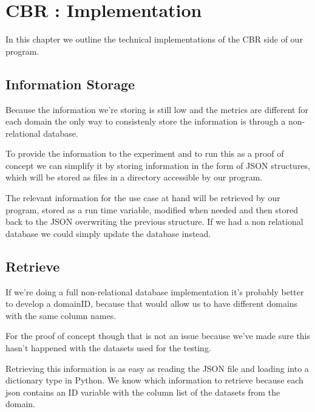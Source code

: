 %
%

\chapter{CBR : Implementation}
\linespread{1.6}
\begin{resumen}
In this chapter we outline the technical implementations of the CBR side of our program.
\end{resumen}

\section{Information Storage}
\label{cap1:sec:informationstorage}

Because the information we're storing is still low and the metrics are different for each domain the only way to consistenly store the information is through a non-relational database.

To provide the information to the experiment and to run this as a proof of concept we can simplify it by storing information in the form of JSON structures, which will be stored as files in a directory accessible by our program.

The relevant information for the use case at hand will be retrieved by our program, stored as a run time variable, modified when needed and then stored back to the JSON overwriting the previous structure.
If we had a non relational database we could simply update the database instead.

\section{Retrieve}
\label{cap1:sec:retrieve}
If we're doing a full non-relational database implementation it's probably better to develop a domainID, because that would allow us to have different domains with the same column names.

For the proof of concept though that is not an issue because we've made sure this hasn't happened with the datasets used for the testing.

Retrieving this information is as easy as reading the JSON file and loading into a dictionary type in Python. We know which information to retrieve because each json contains an ID variable with the column list of the datasets from the domain.

